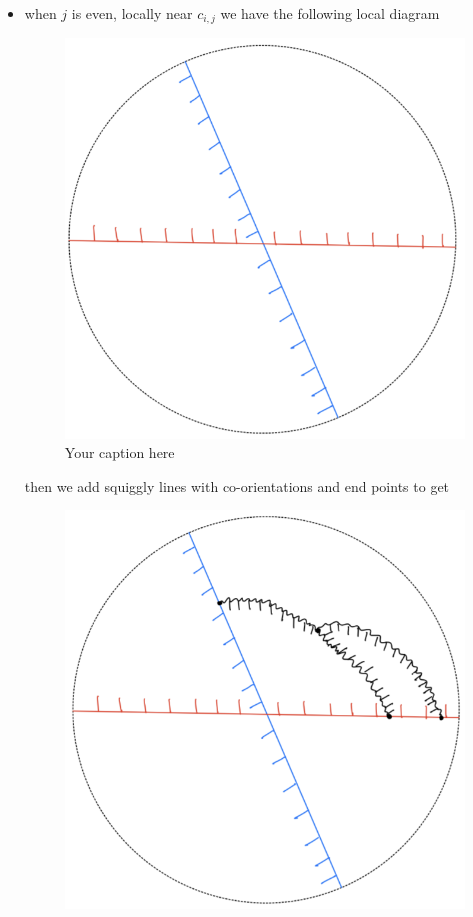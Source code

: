 \begin{definition}
\begin{enumerate}[label = (\roman*)]
\begin{itemize}
\item when $j$ is even, locally near $c_{i,j}$ we have the following local diagram
\begin{figure}[H] 
    \centering
    \includegraphics[scale = 0.95]{diagrams/local_systems_on_as_diagrams/6.png} 
    \caption{Your caption here}
    \label{fig:your-label}
\end{figure}
then we add squiggly lines with co-orientations and end points to get
\begin{figure}[H] 
    \centering
    \includegraphics[scale = 0.95]{diagrams/local_systems_on_as_diagrams/7.png} 

\end{figure}
\end{itemize}
\end{enumerate}
\end{definition}
